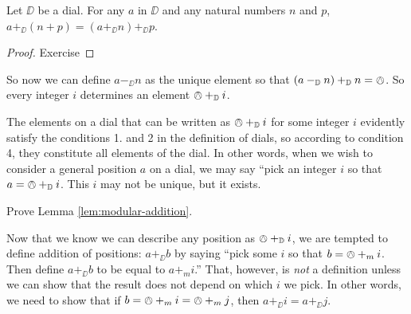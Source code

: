 \begin{lem}\label{lem:modular-addition}
	Let $\DD$ be a dial.
	For any $a$ in $\DD$ and any natural numbers $n$ and $p$, $a +_\DD (n+p) = (a +_\DD n) +_\DD p$.
	
	\begin{proof}
		Exercise
	\end{proof}
\end{lem}

So now we can define $a -_\DD n$ as the unique element so that $(a -_{\mathbb D} n) +_{\mathbb D} n = \owedge$. So every integer $i$ determines an element $\owedge +_{\mathbb D} i$. 

The elements on a dial that can be written as $\owedge +_{\mathbb D} i$ for some integer $i$ evidently satisfy the conditions 1. and 2 in the definition of dials, so according to condition 4, they constitute all elements of the dial.   
In other words, when we wish to consider a general position $a$ on a dial, we may say ``pick an integer $i$ so that $a = \owedge +_{\mathbb D} i$. This $i$ may not be unique, but it exists.

\begin{exer}
	\begin{exercise}
		\item Prove Lemma \ref{lem:modular-addition}.
	\end{exercise}
\end{exer}

Now that we know we can describe any position as $\owedge +_{\mathbb D} i$, we are tempted to define addition of positions: $a +_\DD b$ by saying ``pick some $i$ so that $b = \owedge +_m i$. Then define $a+_\DD b$ to be equal to $a +_m i$.'' That, however, is \emph{not} a definition unless we can show that the result does not depend on which $i$ we pick. In other words, we need to show that if $b=\owedge +_m i = \owedge +_m j$, then $a +_\DD i = a +_\DD j$.

